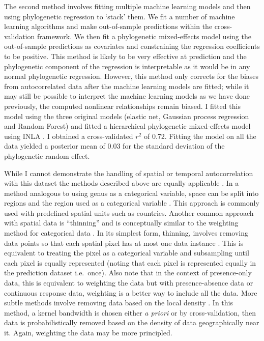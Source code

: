 \documentclass[12pt]{article}
\begin{document}
The second method involves fitting multiple machine learning models and then using phylogenetic regression to `stack' them.
We fit a number of machine learning algorithms and make out-of-sample predictions within the cross-validation framework.
We then fit a phylogenetic mixed-effects model using the out-of-sample predictions as covariates and constraining the regression coefficients to be positive.
This method is likely to be very effective at prediction and the phylogenetic component of the regression is interpretable as it would be in any normal phylogenetic regression.
However, this method only corrects for the biases from autocorrelated data after the machine learning models are fitted; while it may still be possible to interpret the machine learning models as we have done previously, the computed nonlinear relationships remain biased.
I fitted this model using the three original models (elastic net, Gaussian process regression and Random Forest) and fitted a hierarchical phylogenetic mixed-effects model using INLA \citep{INLA}.
I obtained a cross-validated \(r^2\) of 0.72.
Fitting the model on all the data yielded a posterior mean of 0.03 for the standard deviation of the phylogenetic random effect.

While I cannot demonstrate the handling of spatial or temporal autocorrelation with this dataset the methods described above are equally applicable \citep{elith2009species}.
In a method analogous to using genus as a categorical variable, space can be split into regions and the region used as a categorical variable \citep{appelhans2015evaluating}.
This approach is commonly used with predefined spatial units such as countries.
Another common approach with spatial data is ``thinning'' and is conceptually similar to the weighting method for categorical data \citep{elith2010art}.
In its simplest form, thinning, involves removing data points so that each spatial pixel has at most one data instance \citep{elith2010art, verbruggen2013improving}.
This is equivalent to treating the pixel as a categorical variable and subsampling until each pixel is equally represented (noting that each pixel is represented equally in the prediction dataset i.e.~once).
Also note that in the context of presence-only data, this is equivalent to weighting the data but with presence-absence data or continuous response data, weighting is a better way to include all the data.
More subtle methods involve removing data based on the local density \citep{verbruggen2013improving}.
In this method, a kernel bandwidth is chosen either \emph{a priori} or by cross-validation, then data is probabilistically removed based on the density of data geographically near it.
Again, weighting the data may be more principled.
\end{document}
